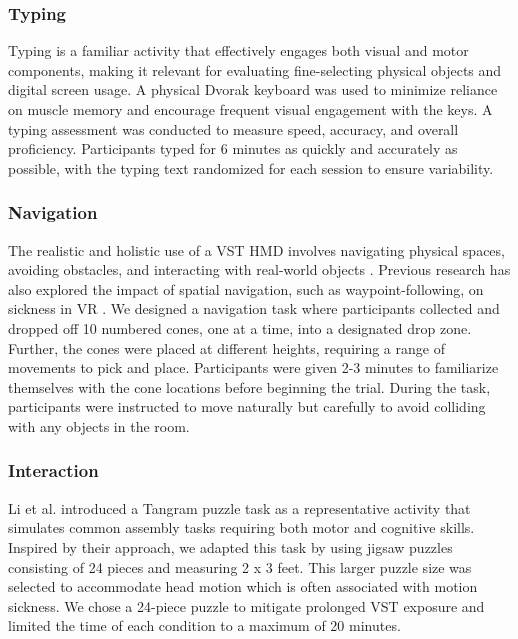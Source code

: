 \subsubsection{Typing} Typing is a familiar activity that effectively engages both visual and motor components, making it relevant for evaluating fine-selecting physical objects and digital screen usage.  A physical Dvorak keyboard \cite{dvorak1936typewriting} was used to minimize reliance on muscle memory and encourage frequent visual engagement with the keys. A typing assessment was conducted to measure speed, accuracy, and overall proficiency. Participants typed for 6 minutes as quickly and accurately as possible, with the typing text randomized for each session to ensure variability. 
\subsubsection{Navigation} The realistic and holistic use of a VST HMD involves navigating physical spaces, avoiding obstacles, and interacting with real-world objects \cite{bailenson2024seeing,de2018augmented,erickson2019cold}. Previous research has also explored the impact of spatial navigation, such as waypoint-following, on sickness in VR  \cite{al2019effect}. We designed a navigation task where participants collected and dropped off 10 numbered cones, one at a time, into a designated drop zone.  Further, the cones were placed at different heights, requiring a range of movements to pick and place. Participants were given 2-3 minutes to familiarize themselves with the cone locations before beginning the trial. During the task, participants were instructed to move naturally but carefully to avoid colliding with any objects in the room.
\subsubsection{Interaction} Li et al. \cite{li2022mixed} introduced a Tangram puzzle task as a representative activity that simulates common assembly tasks requiring both motor and cognitive skills. Inspired by their approach, we adapted this task by using jigsaw puzzles consisting of 24 pieces and measuring 2 x 3 feet. This larger puzzle size was selected to accommodate head motion which is often associated with motion sickness. We chose a 24-piece puzzle to mitigate prolonged VST exposure and limited the time of each condition to a maximum of 20 minutes.

